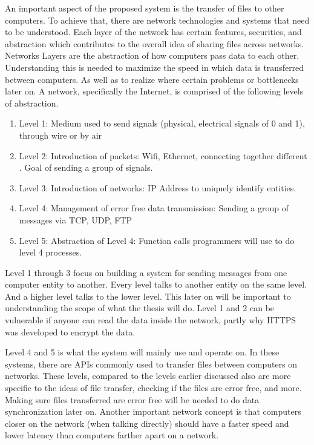 \documentclass[acmsmall]{acmart}
\begin{document}
An important aspect of the proposed system is the transfer of files to other computers. To achieve that, there are network technologies and systems that need to be understood. Each layer of the network has certain features, securities, and abstraction which contributes to the overall idea of sharing files across networks. Networks Layers are the abstraction of how computers pass data to each other. Understanding this is needed to maximize the speed in which data is transferred between computers. As well as to realize where certain problems or bottlenecks later on. A network, specifically the Internet, is comprised of the following levels of abstraction. \cite{kurose}
\begin{enumerate}
    \item Level 1: Medium used to send signals (physical, electrical signals of 0
and 1), through wire or by air
    \item Level 2: Introduction of packets: Wifi, Ethernet, connecting together
different . Goal of sending a group of signals.
    \item Level 3: Introduction of networks: IP Address to uniquely identify
entities.
    \item Level 4: Management of error free data transmission: Sending a group
of messages via TCP, UDP, FTP
    \item Level 5: Abstraction of Level 4: Function calls programmers will use
to do level 4 processes.
\end{enumerate}

Level 1 through 3 focus on building a system for sending messages from one computer entity to another. Every level talks to another entity on the same level. And a higher level talks to the lower level. This later on will be important to understanding the scope of what the thesis will do. Level 1 and 2 can be vulnerable if anyone can read the data inside the network, partly why HTTPS was developed to encrypt the data. 

Level 4 and 5 is what the system will mainly use and operate on. In these systems, there are APIs commonly used to transfer files between computers on networks. These levels, compared to the levels earlier discussed also are more specific to the ideas of file transfer, checking if the files are error free, and more. Making sure files transferred are error free will be needed to do data synchronization later on. Another important network concept is that computers closer on the network (when talking directly) should have a faster speed and lower latency than computers farther apart on a network.
\end{document}
